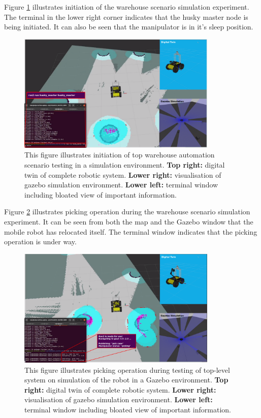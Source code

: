Figure \ref{fig:R:WA:simTopLevel0} illustrates initiation of the warehouse scenario simulation experiment. The terminal in the lower right corner indicates that the husky master node is being initiated. It can also be seen that the manipulator is in it's sleep position.

\begin{figure}[H]
  \centering
  \includegraphics[width = 0.85\textwidth]{Figures/figSimTopLevel0.pdf}
  \caption{This figure illustrates initiation of top warehouse automation scenario testing in a simulation environment. \textbf{Top right:} digital twin of complete robotic system. \textbf{Lower right:} visualisation of gazebo simulation environment. \textbf{Lower left:} terminal window including bloated view of important information.}
  \label{fig:R:WA:simTopLevel0}
\end{figure}

Figure \ref{fig:R:WA:simTopLevel1} illustrates picking operation during the warehouse scenario simulation experiment. It can be seen from both the map and the Gazebo window that the mobile robot has relocated itself. The terminal window indicates that the picking operation is under way.

\begin{figure}[H]
  \centering
  \includegraphics[width = 0.85\textwidth]{Figures/figSimTopLevel1.pdf}
  \caption{This figure illustrates picking operation during testing of top-level system on simulation of the robot in a Gazebo environment. \textbf{Top right:} digital twin of complete robotic system. \textbf{Lower right:} visualisation of gazebo simulation environment. \textbf{Lower left:} terminal window including bloated view of important information.}
  \label{fig:R:WA:simTopLevel1}
\end{figure}

